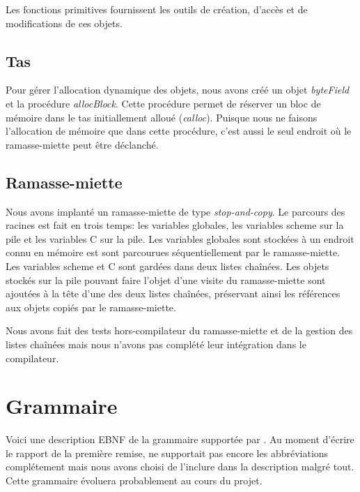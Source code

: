 \documentclass[10pt]{report}
\begin{document}
Les fonctions primitives fournissent les outils de création, d'accès et de
modifications de ces objets.

\section{Tas}

Pour gérer l'allocation dynamique des objets, nous avons créé un objet
\emph{byteField} et la procédure \emph{allocBlock}. Cette procédure permet de
réserver un bloc de mémoire dans le tas initiallement alloué
(\emph{calloc}). Puisque nous ne faisons l'allocation de mémoire que dans
cette procédure, c'est aussi le seul endroit où le ramasse-miette peut être
déclanché.

\section{Ramasse-miette}

Nous avons implanté un ramasse-miette de type \emph{stop-and-copy}. Le
parcours des racines est fait en trois temps: les variables globales, les
variables scheme sur la pile et les variables C sur la pile. Les variables
globales sont stockées à un endroit connu en mémoire est sont parcourues
séquentiellement par le ramasse-miette. Les variables scheme et C sont gardées
dans deux listes chaînées. Les objets stockés sur la pile pouvant faire
l'objet d'une visite du ramasse-miette sont ajoutées à la tête d'une des deux
listes chaînées, préservant ainsi les références aux objets copiés par le
ramasse-miette.

Nous avons fait des tests hors-compilateur du ramasse-miette et de la gestion
des listes chaînées mais nous n'avons pas complété leur intégration dans le
compilateur.

\appendix
\chapter{Grammaire}
\label{grammaire}
Voici une description EBNF de la grammaire supportée par \sins{}. Au
moment d'écrire le rapport de la première remise, \sins{} ne
supportait pas encore les abbréviations complétement mais nous avons
choisi de l'inclure dans la description malgré tout. Cette grammaire
évoluera probablement au cours du projet.

\setlength{\grammarindent}{3em}
\end{document}

